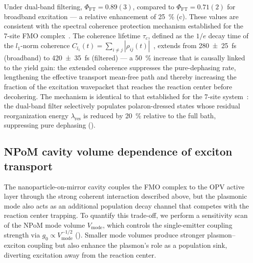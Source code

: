 \documentclass[onecolumn,a4paper,12pt]{article}
\begin{document}
Under dual-band filtering, $\Phi_{\mathrm{FT}} = 0.89(3)$, compared to $\Phi_{\mathrm{FT}} = 0.71(2)$ for broadband excitation --- a relative enhancement of \qty{25}{\percent} (c). These values are consistent with the spectral coherence protection mechanism established for the 7-site FMO complex~\cite{Kouam2026}.
The coherence lifetime $\tau_c$, defined as the $1/e$ decay time of the $l_1$-norm coherence $C_{l_1}(t) = \sum_{i\neq j} |\rho_{ij}(t)|$~\cite{Baumgratz2014}, extends from \qty{280(25)}{\fs} (broadband) to \qty{420(35)}{\fs} (filtered) --- a \qty{50}{\percent} increase that is causally linked to the yield gain: the extended coherence suppresses the pure-dephasing rate, lengthening the effective transport mean-free path and thereby increasing the fraction of the excitation wavepacket that reaches the reaction center before decohering.
The mechanism is identical to that established for the 7-site system~\cite{Kouam2026}: the dual-band filter selectively populates polaron-dressed states whose residual reorganization energy $\lambda_{\mathrm{res}}$ is reduced by \qty{20}{\percent} relative to the full bath, suppressing pure dephasing ().

\subsection*{NPoM cavity volume dependence of exciton transport}

The nanoparticle-on-mirror cavity couples the FMO complex to the OPV active layer through the strong coherent interaction described above, but the plasmonic mode also acts as an additional population decay channel that competes with the reaction center trapping.
To quantify this trade-off, we perform a sensitivity scan of the NPoM mode volume $V_{\mathrm{mode}}$, which controls the single-emitter coupling strength via $g_0 \propto V_{\mathrm{mode}}^{-1/2}$ ().
Smaller mode volumes produce stronger plasmon--exciton coupling but also enhance the plasmon's role as a population sink, diverting excitation away from the reaction center.
\end{document}
